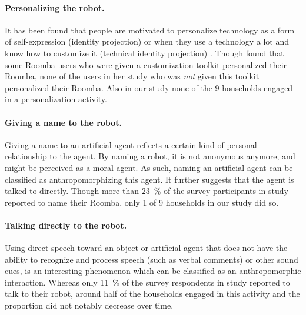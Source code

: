 \documentclass{frontiersSCNS} %
\begin{document}

\paragraph*{Personalizing the robot.} It has been found that people are
motivated to personalize technology as a form of self-expression (identity
projection) or when they use a technology a lot and know how to customize it
(technical identity projection) \citep{blom_personalization:_2000}. Though
\cite{sung_pimp_2009} found that some Roomba users who were given a
customization toolkit personalized their Roomba, none of the users in her study
who was \textit{not} given this toolkit personalized their Roomba. Also in our
study none of the 9 households engaged in a personalization activity.

\paragraph*{Giving a name to the robot.} Giving a name to an artificial agent
reflects a certain kind of personal relationship to the agent. By naming a
robot, it is not anonymous anymore, and might be perceived as a moral agent. As
such, naming an artificial agent can be classified as anthropomorphizing this
agent. It further suggests that the agent is talked to directly. Though more
than 23~\% of the survey participants in \cite{sung_housewives_2008} study
reported to name their Roomba, only 1 of 9 households in our study did so. 

\paragraph*{Talking directly to the robot.} Using direct speech toward an object
or artificial agent that does not have the ability to recognize and process
speech (such as verbal comments) or other sound cues, is an interesting
phenomenon which can be classified as an anthropomorphic interaction. Whereas
only 11~\% of the survey respondents in \cite{sung_housewives_2008} study
reported to talk to their robot, around half of the households engaged in this
activity and the proportion did not notably decrease over time. 
\end{document}
